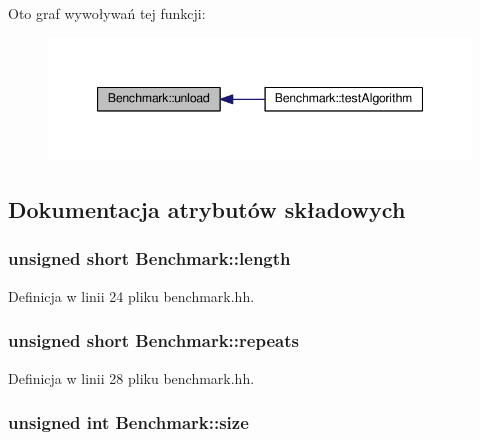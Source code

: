 Oto graf wywoływań tej funkcji\-:\nopagebreak
\begin{figure}[H]
\begin{center}
\leavevmode
\includegraphics[width=344pt]{class_benchmark_a2dcfb6ee9e648ae88d8c131b2b191bed_icgraph}
\end{center}
\end{figure}




\subsection{Dokumentacja atrybutów składowych}
\hypertarget{class_benchmark_a087c54914ceb80aba52c58136ae20f7e}{
\subsubsection[{length}]{\setlength{\rightskip}{0pt plus 5cm}unsigned short Benchmark\-::length\hspace{0.3cm}{\ttfamily [private]}}}\label{class_benchmark_a087c54914ceb80aba52c58136ae20f7e}


Definicja w linii 24 pliku benchmark.\-hh.

\hypertarget{class_benchmark_afe755071bf6217d77ccba5d727709638}{
\subsubsection[{repeats}]{\setlength{\rightskip}{0pt plus 5cm}unsigned short Benchmark\-::repeats\hspace{0.3cm}{\ttfamily [private]}}}\label{class_benchmark_afe755071bf6217d77ccba5d727709638}


Definicja w linii 28 pliku benchmark.\-hh.

\hypertarget{class_benchmark_a7e989579d9ce0c5ed136a2cbeb83b5b8}{
\subsubsection[{size}]{\setlength{\rightskip}{0pt plus 5cm}unsigned int Benchmark\-::size\hspace{0.3cm}{\ttfamily [private]}}}\label{class_benchmark_a7e989579d9ce0c5ed136a2cbeb83b5b8}


